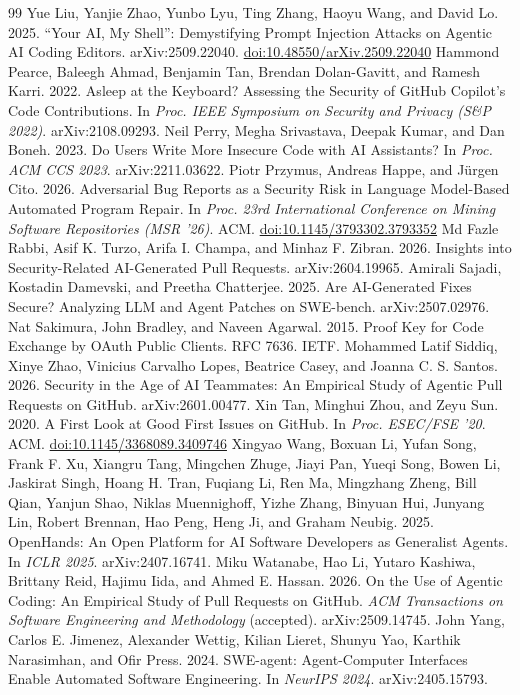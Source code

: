 \documentclass[acmsmall,screen,nonacm]{acmart}
\providecommand{\doi}[1]{\href{https://doi.org/#1}{doi:#1}}
\begin{document}
\begin{thebibliography}{99}
 Yue Liu, Yanjie Zhao, Yunbo Lyu, Ting Zhang, Haoyu Wang, and David Lo. 2025. ``Your AI, My Shell'': Demystifying Prompt Injection Attacks on Agentic AI Coding Editors. arXiv:2509.22040. \doi{10.48550/arXiv.2509.22040}
 Hammond Pearce, Baleegh Ahmad, Benjamin Tan, Brendan Dolan-Gavitt, and Ramesh Karri. 2022. Asleep at the Keyboard? Assessing the Security of GitHub Copilot's Code Contributions. In \emph{Proc. IEEE Symposium on Security and Privacy (S\&P 2022)}. arXiv:2108.09293.
 Neil Perry, Megha Srivastava, Deepak Kumar, and Dan Boneh. 2023. Do Users Write More Insecure Code with AI Assistants? In \emph{Proc. ACM CCS 2023}. arXiv:2211.03622.
 Piotr Przymus, Andreas Happe, and J\"urgen Cito. 2026. Adversarial Bug Reports as a Security Risk in Language Model-Based Automated Program Repair. In \emph{Proc. 23rd International Conference on Mining Software Repositories (MSR '26)}. ACM. \doi{10.1145/3793302.3793352}
 Md Fazle Rabbi, Asif K. Turzo, Arifa I. Champa, and Minhaz F. Zibran. 2026. Insights into Security-Related AI-Generated Pull Requests. arXiv:2604.19965.
 Amirali Sajadi, Kostadin Damevski, and Preetha Chatterjee. 2025. Are AI-Generated Fixes Secure? Analyzing LLM and Agent Patches on SWE-bench. arXiv:2507.02976.
 Nat Sakimura, John Bradley, and Naveen Agarwal. 2015. Proof Key for Code Exchange by OAuth Public Clients. RFC 7636. IETF.
 Mohammed Latif Siddiq, Xinye Zhao, Vinicius Carvalho Lopes, Beatrice Casey, and Joanna C. S. Santos. 2026. Security in the Age of AI Teammates: An Empirical Study of Agentic Pull Requests on GitHub. arXiv:2601.00477.
 Xin Tan, Minghui Zhou, and Zeyu Sun. 2020. A First Look at Good First Issues on GitHub. In \emph{Proc. ESEC/FSE '20}. ACM. \doi{10.1145/3368089.3409746}
 Xingyao Wang, Boxuan Li, Yufan Song, Frank F. Xu, Xiangru Tang, Mingchen Zhuge, Jiayi Pan, Yueqi Song, Bowen Li, Jaskirat Singh, Hoang H. Tran, Fuqiang Li, Ren Ma, Mingzhang Zheng, Bill Qian, Yanjun Shao, Niklas Muennighoff, Yizhe Zhang, Binyuan Hui, Junyang Lin, Robert Brennan, Hao Peng, Heng Ji, and Graham Neubig. 2025. OpenHands: An Open Platform for AI Software Developers as Generalist Agents. In \emph{ICLR 2025}. arXiv:2407.16741.
 Miku Watanabe, Hao Li, Yutaro Kashiwa, Brittany Reid, Hajimu Iida, and Ahmed E. Hassan. 2026. On the Use of Agentic Coding: An Empirical Study of Pull Requests on GitHub. \emph{ACM Transactions on Software Engineering and Methodology} (accepted). arXiv:2509.14745.
 John Yang, Carlos E. Jimenez, Alexander Wettig, Kilian Lieret, Shunyu Yao, Karthik Narasimhan, and Ofir Press. 2024. SWE-agent: Agent-Computer Interfaces Enable Automated Software Engineering. In \emph{NeurIPS 2024}. arXiv:2405.15793.

\end{thebibliography}
\end{document}
